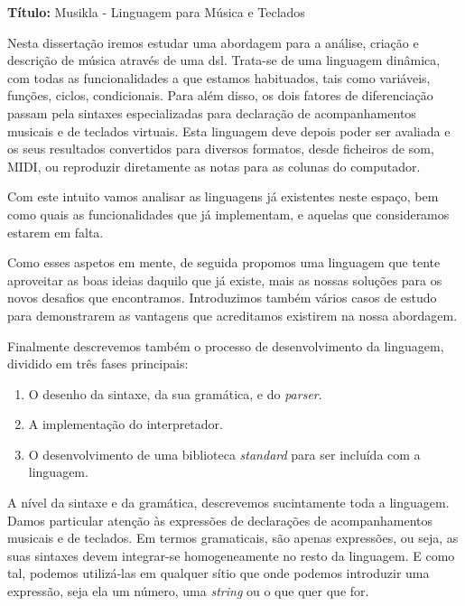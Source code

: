 \textbf{Título:} Musikla - Linguagem para Música e Teclados

\bigskip

Nesta dissertação iremos estudar uma abordagem para a análise, criação e descrição de música através de uma \acrfull{dsl}. Trata-se de uma linguagem dinâmica, com todas as funcionalidades a que estamos habituados, tais como variáveis, funções, ciclos, condicionais. Para além disso, os dois fatores de diferenciação passam pela sintaxes especializadas para declaração de acompanhamentos musicais e de teclados virtuais. Esta linguagem deve depois poder ser avaliada e os seus resultados convertidos para diversos formatos, desde ficheiros de som, MIDI, ou reproduzir diretamente as notas para as colunas do computador.

Com este intuito vamos analisar as linguagens já existentes neste espaço, bem como quais as funcionalidades que já implementam, e aquelas que consideramos estarem em falta.

Como esses aspetos em mente, de seguida propomos uma linguagem que tente aproveitar as boas ideias daquilo que já existe, mais as nossas soluções para os novos desafios que encontramos. Introduzimos também vários casos de estudo para demonstrarem as vantagens que acreditamos existirem na nossa abordagem.

Finalmente descrevemos também o processo de desenvolvimento da linguagem, dividido em três fases principais: 
\begin{enumerate}
 \item O desenho da sintaxe, da sua gramática, e do \textit{parser}.
 \item A implementação do interpretador.
 \item O desenvolvimento de uma biblioteca \textit{standard} para ser incluída com a linguagem.
\end{enumerate}

A nível da sintaxe e da gramática, descrevemos sucintamente toda a linguagem. Damos particular atenção às expressões de declarações de acompanhamentos musicais e de teclados. Em termos gramaticais, são apenas expressões, ou seja, as suas sintaxes devem integrar-se homogeneamente no resto da linguagem. E como tal, podemos utilizá-las em qualquer sítio que onde podemos introduzir uma expressão, seja ela um número, uma \textit{string} ou o que quer que for. 

